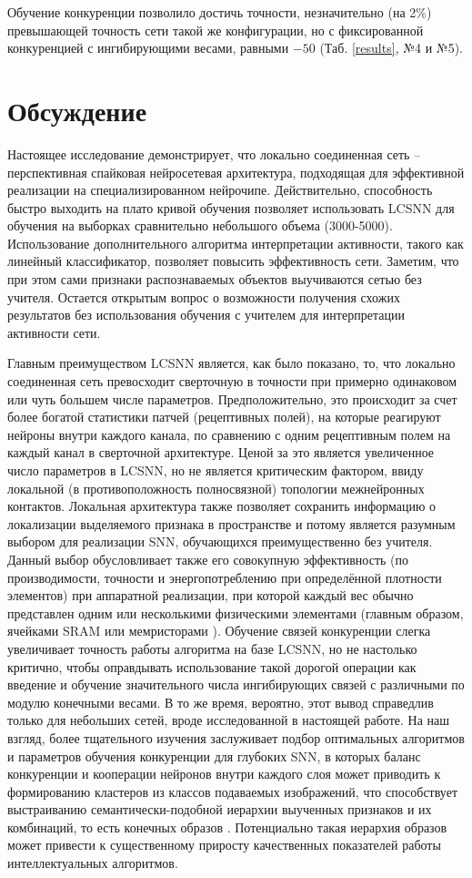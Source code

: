 \documentclass[a4paper]{article}
\begin{document}
Обучение конкуренции позволило достичь точности, незначительно (на 2\%) превышающей точность сети такой же конфигурации, но с фиксированной конкуренцией с ингибирующими весами, равными $-50$ (Таб. \ref{results}, №4 и №5). 

\section{Обсуждение}
Настоящее исследование демонстрирует, что локально соединенная сеть – перспективная спайковая нейросетевая архитектура, подходящая для эффективной реализации на специализированном нейрочипе. Действительно, способность быстро выходить на плато кривой обучения позволяет использовать LCSNN для обучения на выборках сравнительно небольшого объема (3000-5000). Использование дополнительного алгоритма интерпретации активности, такого как линейный классификатор, позволяет повысить эффективность сети. Заметим, что при этом сами признаки распознаваемых объектов выучиваются сетью без учителя. Остается открытым вопрос о возможности получения схожих результатов без использования обучения с учителем для интерпретации активности сети.

Главным преимуществом LCSNN является, как было показано, то, что локально соединенная сеть превосходит сверточную в точности при примерно одинаковом или чуть большем числе параметров. Предположительно, это происходит за счет более богатой статистики патчей (рецептивных полей), на которые реагируют нейроны внутри каждого канала, по сравнению с одним рецептивным полем на каждый канал в сверточной архитектуре. Ценой за это является увеличенное число параметров в LCSNN, но не является критическим фактором, ввиду локальной (в противоположность полносвязной) топологии межнейронных контактов. Локальная архитектура также позволяет сохранить информацию о локализации выделяемого признака в пространстве и потому является разумным выбором для реализации SNN, обучающихся преимущественно без учителя. Данный выбор обусловливает также его совокупную эффективность (по производимости, точности и энергопотреблению при определённой плотности элементов) при аппаратной реализации, при которой каждый вес обычно представлен одним или несколькими физическими элементами (главным образом, ячейками SRAM \cite{TrueNorth, Loihi} или мемристорами \cite{Li_2018}).
Обучение связей конкуренции слегка увеличивает точность работы алгоритма на базе LCSNN, но не настолько критично, чтобы оправдывать использование такой дорогой операции как введение и обучение значительного числа ингибирующих связей с различными по модулю конечными весами. В то же время, вероятно, этот вывод справедлив только для небольших сетей, вроде исследованной в настоящей работе. На наш взгляд, более тщательного изучения заслуживает подбор оптимальных алгоритмов и параметров обучения конкуренции для глубоких SNN, в которых баланс конкуренции и кооперации нейронов внутри каждого слоя может приводить к формированию кластеров из классов подаваемых изображений, что способствует выстраиванию семантически-подобной иерархии выученных признаков и их комбинаций, то есть конечных образов \cite{10.1007/978-3-030-30425-6_30}. Потенциально такая иерархия образов может привести к существенному приросту качественных показателей работы интеллектуальных алгоритмов. 
\end{document}
